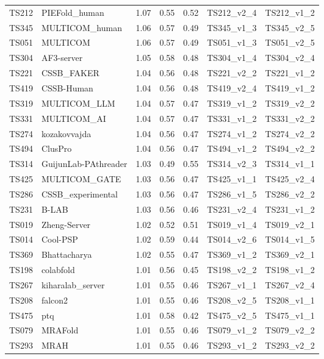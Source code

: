 \begin{table}[ht]
{\begin{tabular}{llrrrll}
TS212 & PIEFold\_human & 1.07 & 0.55 & 0.52 & TS212\_v2\_4 & TS212\_v1\_2 \\ 
TS345 & MULTICOM\_human & 1.06 & 0.57 & 0.49 & TS345\_v1\_3 & TS345\_v2\_5 \\ 
TS051 & MULTICOM & 1.06 & 0.57 & 0.49 & TS051\_v1\_3 & TS051\_v2\_5 \\ 
TS304 & AF3-server & 1.05 & 0.58 & 0.48 & TS304\_v1\_4 & TS304\_v2\_4 \\ 
TS221 & CSSB\_FAKER & 1.04 & 0.56 & 0.48 & TS221\_v2\_2 & TS221\_v1\_2 \\ 
TS419 & CSSB-Human & 1.04 & 0.56 & 0.48 & TS419\_v2\_4 & TS419\_v1\_2 \\ 
TS319 & MULTICOM\_LLM & 1.04 & 0.57 & 0.47 & TS319\_v1\_2 & TS319\_v2\_2 \\ 
TS331 & MULTICOM\_AI & 1.04 & 0.57 & 0.47 & TS331\_v1\_2 & TS331\_v2\_2 \\ 
TS274 & kozakovvajda & 1.04 & 0.56 & 0.47 & TS274\_v1\_2 & TS274\_v2\_2 \\ 
TS494 & ClusPro & 1.04 & 0.56 & 0.47 & TS494\_v1\_2 & TS494\_v2\_2 \\ 
TS314 & GuijunLab-PAthreader & 1.03 & 0.49 & 0.55 & TS314\_v2\_3 & TS314\_v1\_1 \\ 
TS425 & MULTICOM\_GATE & 1.03 & 0.56 & 0.47 & TS425\_v1\_1 & TS425\_v2\_4 \\ 
TS286 & CSSB\_experimental & 1.03 & 0.56 & 0.47 & TS286\_v1\_5 & TS286\_v2\_2 \\ 
TS231 & B-LAB & 1.03 & 0.56 & 0.46 & TS231\_v2\_4 & TS231\_v1\_2 \\ 
TS019 & Zheng-Server & 1.02 & 0.52 & 0.51 & TS019\_v1\_4 & TS019\_v2\_1 \\ 
TS014 & Cool-PSP & 1.02 & 0.59 & 0.44 & TS014\_v2\_6 & TS014\_v1\_5 \\ 
TS369 & Bhattacharya & 1.02 & 0.55 & 0.47 & TS369\_v1\_2 & TS369\_v2\_1 \\ 
TS198 & colabfold & 1.01 & 0.56 & 0.45 & TS198\_v2\_2 & TS198\_v1\_2 \\ 
TS267 & kiharalab\_server & 1.01 & 0.55 & 0.46 & TS267\_v1\_1 & TS267\_v2\_4 \\ 
TS208 & falcon2 & 1.01 & 0.55 & 0.46 & TS208\_v2\_5 & TS208\_v1\_1 \\ 
TS475 & ptq & 1.01 & 0.58 & 0.42 & TS475\_v2\_5 & TS475\_v1\_1 \\ 
TS079 & MRAFold & 1.01 & 0.55 & 0.46 & TS079\_v1\_2 & TS079\_v2\_2 \\ 
TS293 & MRAH & 1.01 & 0.55 & 0.46 & TS293\_v1\_2 & TS293\_v2\_2 \\ 

\end{tabular}}
\end{table}
